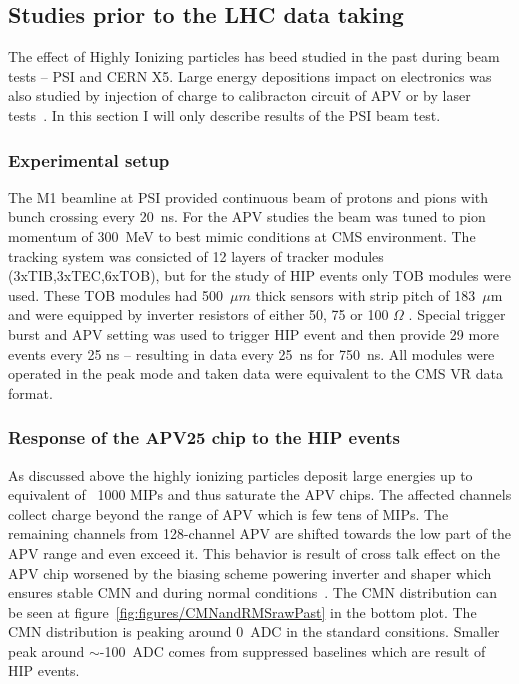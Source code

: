 \subsection{Studies prior to the LHC data taking~\label{sec:HIPinPast}}

The effect of Highly Ionizing particles has beed studied in the past during beam tests -- PSI and CERN X5. Large energy depositions impact on electronics was also studied by injection of charge to calibracton circuit of APV or by laser tests~\cite{Adam:2005pz}. In this section I will only describe results of the PSI beam test.

\subsubsection{Experimental setup}

The M1 beamline at PSI provided continuous beam of protons and pions with bunch crossing every 20~ns. For the APV studies the beam was tuned to pion momentum of 300~MeV to best mimic conditions at CMS environment. The tracking system was consicted of 12 layers of tracker modules (3xTIB,3xTEC,6xTOB), but for the study of HIP events only TOB modules were used. These TOB modules had 500~$\mu m$ thick sensors with strip pitch of 183~$\mu$m and were equipped by inverter resistors of either 50, 75 or 100 $\Omega$ . Special trigger burst and APV setting was used to trigger HIP event and then provide 29 more events every 25 ns -- resulting in data every 25~ns for 750~ns. All modules were operated in the peak mode and taken data were equivalent to the CMS VR data format. 




\subsubsection{Response of the APV25 chip to the HIP events}

As discussed above the highly ionizing particles deposit large energies up to equivalent of ~1000 MIPs and thus saturate the APV chips. The affected channels collect charge beyond the range of APV which is few tens of MIPs. The remaining channels from 128-channel APV are shifted towards the low part of the APV range and even exceed it. This behavior is result of cross talk effect on the APV chip worsened by the biasing scheme powering inverter and shaper which ensures stable CMN and during normal conditions~\cite{Bainbridge:2004jc}. The CMN distribution can be seen at figure~\ref{fig:figures/CMNandRMSrawPast} in the bottom plot. The CMN distribution is peaking around 0~ADC in the standard consitions. Smaller peak around $\sim$-100~ADC comes from suppressed baselines which are result of HIP events. 

